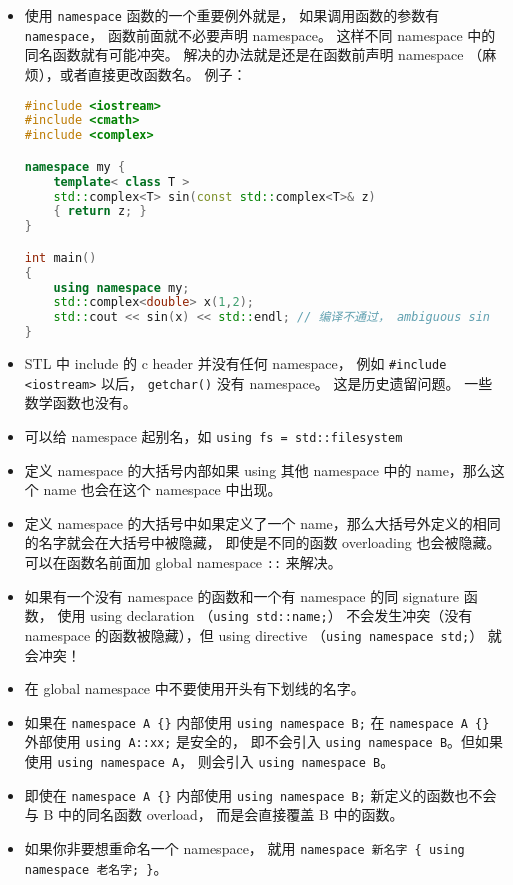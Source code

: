 
\begin{issues}
\issueDraft
\end{issues}

\begin{itemize}
\item 使用 \verb|namespace| 函数的一个重要例外就是， 如果调用函数的参数有 \verb|namespace|， 函数前面就不必要声明 namespace。 这样不同 namespace 中的同名函数就有可能冲突。 解决的办法就是还是在函数前声明 namespace （麻烦），或者直接更改函数名。 例子：
\begin{lstlisting}[language=cpp]
#include <iostream>
#include <cmath>
#include <complex>

namespace my {
	template< class T >
	std::complex<T> sin(const std::complex<T>& z)
	{ return z; }
}

int main()
{
	using namespace my;
	std::complex<double> x(1,2);
	std::cout << sin(x) << std::endl; // 编译不通过， ambiguous sin
}
\end{lstlisting}
\item STL 中 include 的 c header 并没有任何 namespace， 例如 \verb|#include <iostream>| 以后， \verb|getchar()| 没有 namespace。 这是历史遗留问题。 一些数学函数也没有。
\item 可以给 namespace 起别名，如 \verb`using fs = std::filesystem`
\item 定义 namespace 的大括号内部如果 using 其他 namespace 中的 name，那么这个 name 也会在这个 namespace 中出现。
\item 定义 namespace 的大括号中如果定义了一个 name，那么大括号外定义的相同的名字就会在大括号中被隐藏， 即使是不同的函数 overloading 也会被隐藏。 可以在函数名前面加 global namespace \verb|::| 来解决。
\item 如果有一个没有 namespace 的函数和一个有 namespace 的同 signature 函数， 使用 using declaration （\verb|using std::name;|） 不会发生冲突（没有 namespace 的函数被隐藏），但 using directive （\verb|using namespace std;|） 就会冲突！
\item 在 global namespace 中不要使用开头有下划线的名字。
\item 如果在 \verb|namespace A {}| 内部使用 \verb|using namespace B;| 在 \verb|namespace A {}| 外部使用 \verb|using A::xx;| 是安全的， 即不会引入 \verb|using namespace B|。但如果使用 \verb|using namespace A|， 则会引入 \verb|using namespace B|。
\item 即使在 \verb|namespace A {}| 内部使用 \verb|using namespace B;|  新定义的函数也不会与 B 中的同名函数 overload， 而是会直接覆盖 B 中的函数。
\item 如果你非要想重命名一个 namespace， 就用 \verb|namespace 新名字 { using namespace 老名字; }|。
\end{itemize}
